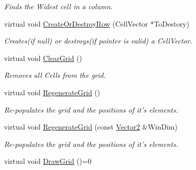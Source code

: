 \begin{DoxyCompactItemize}
\begin{DoxyCompactList}\small\item\em Finds the Widest cell in a column. \item\end{DoxyCompactList}\item 
\hypertarget{classphys_1_1UI_1_1CellGrid_af4f183946fb12cb9150b337c17343c31}{
virtual void \hyperlink{classphys_1_1UI_1_1CellGrid_af4f183946fb12cb9150b337c17343c31}{CreateOrDestroyRow} (CellVector $\ast$ToDestory)}
\label{d8/d59/classphys_1_1UI_1_1CellGrid_af4f183946fb12cb9150b337c17343c31}

\begin{DoxyCompactList}\small\item\em Creates(if null) or destroys(if pointer is valid) a CellVector. \item\end{DoxyCompactList}\item 
\hypertarget{classphys_1_1UI_1_1CellGrid_a62025df19045011c3ef7958c253f8f3c}{
virtual void \hyperlink{classphys_1_1UI_1_1CellGrid_a62025df19045011c3ef7958c253f8f3c}{ClearGrid} ()}
\label{d8/d59/classphys_1_1UI_1_1CellGrid_a62025df19045011c3ef7958c253f8f3c}

\begin{DoxyCompactList}\small\item\em Removes all Cells from the grid. \item\end{DoxyCompactList}\item 
\hypertarget{classphys_1_1UI_1_1CellGrid_a1fecbe653e802df38b5bb416a73efda9}{
virtual void \hyperlink{classphys_1_1UI_1_1CellGrid_a1fecbe653e802df38b5bb416a73efda9}{RegenerateGrid} ()}
\label{d8/d59/classphys_1_1UI_1_1CellGrid_a1fecbe653e802df38b5bb416a73efda9}

\begin{DoxyCompactList}\small\item\em Re-\/populates the grid and the positions of it's elements. \item\end{DoxyCompactList}\item 
\hypertarget{classphys_1_1UI_1_1CellGrid_ab426bff9fe6c637aa4438fd00cdde71b}{
virtual void \hyperlink{classphys_1_1UI_1_1CellGrid_ab426bff9fe6c637aa4438fd00cdde71b}{RegenerateGrid} (const \hyperlink{classphys_1_1Vector2}{Vector2} \&WinDim)}
\label{d8/d59/classphys_1_1UI_1_1CellGrid_ab426bff9fe6c637aa4438fd00cdde71b}

\begin{DoxyCompactList}\small\item\em Re-\/populates the grid and the positions of it's elements. \item\end{DoxyCompactList}\item 
\hypertarget{classphys_1_1UI_1_1CellGrid_ada5c15ae1b0372277d1bde05e348ccfd}{
virtual void \hyperlink{classphys_1_1UI_1_1CellGrid_ada5c15ae1b0372277d1bde05e348ccfd}{DrawGrid} ()=0}
\label{d8/d59/classphys_1_1UI_1_1CellGrid_ada5c15ae1b0372277d1bde05e348ccfd}


\end{DoxyCompactItemize}
